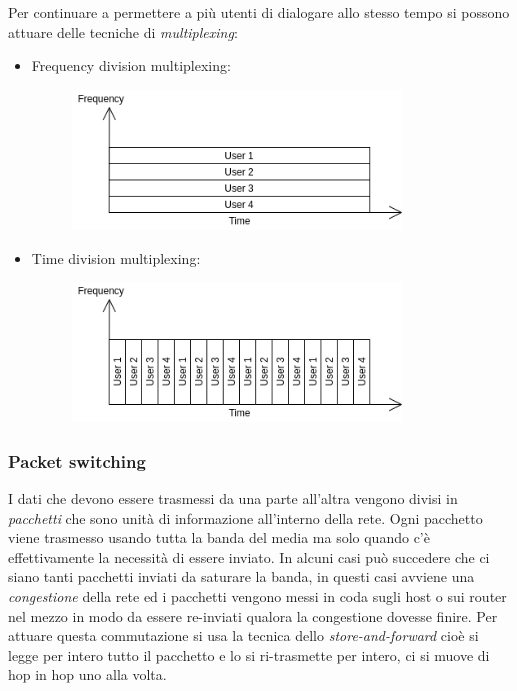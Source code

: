 Per continuare a permettere a più utenti di dialogare allo stesso tempo si possono attuare delle tecniche di \emph{multiplexing}:
\begin{itemize}
    \item Frequency division multiplexing:
    \begin{figure}[H]
        \centering
        \includegraphics[width=330px]{images/1_Introduzione/FDM.png}
    \end{figure}
    
    \item Time division multiplexing:
    \begin{figure}[H]
        \centering
        \includegraphics[width=330px]{images/1_Introduzione/TDM.png}
    \end{figure}
\end{itemize}

\subsubsection{Packet switching}
I dati che devono essere trasmessi da una parte all'altra vengono divisi in \emph{pacchetti} che sono unità di informazione all'interno della rete. Ogni pacchetto viene trasmesso usando tutta la banda del media ma solo quando c'è effettivamente la necessità di essere inviato. In alcuni casi può succedere che ci siano tanti pacchetti inviati da saturare la banda, in questi casi avviene una \emph{congestione} della rete ed i pacchetti vengono messi in coda sugli host o sui router nel mezzo in modo da essere re-inviati qualora la congestione dovesse finire. Per attuare questa commutazione si usa la tecnica dello \emph{store-and-forward} cioè si legge per intero tutto il pacchetto e lo si ri-trasmette per intero, ci si muove di hop in hop uno alla volta.


